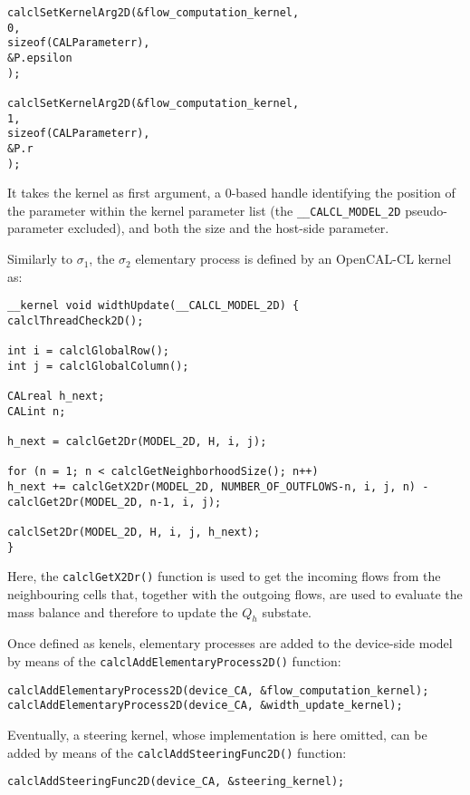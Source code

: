 \begin{lstlisting}[basicstyle=\footnotesize, numbers=none]
calclSetKernelArg2D(&flow_computation_kernel,
0,
sizeof(CALParameterr),
&P.epsilon
);

calclSetKernelArg2D(&flow_computation_kernel,
1,
sizeof(CALParameterr),
&P.r
);
\end{lstlisting}

\noindent It takes the kernel as first argument, a 0-based handle
identifying the position of the parameter within the kernel
parameter list (the \verb'__CALCL_MODEL_2D' pseudo-parameter
excluded), and both the size and the host-side parameter.

Similarly to $\sigma_1$, the $\sigma_2$ elementary process is
defined by an OpenCAL-CL kernel as:

\begin{lstlisting}[basicstyle=\footnotesize, numbers=none]
__kernel void widthUpdate(__CALCL_MODEL_2D) {
calclThreadCheck2D();

int i = calclGlobalRow();
int j = calclGlobalColumn();

CALreal h_next;
CALint n;

h_next = calclGet2Dr(MODEL_2D, H, i, j);

for (n = 1; n < calclGetNeighborhoodSize(); n++)
h_next += calclGetX2Dr(MODEL_2D, NUMBER_OF_OUTFLOWS-n, i, j, n) - calclGet2Dr(MODEL_2D, n-1, i, j);

calclSet2Dr(MODEL_2D, H, i, j, h_next);
}
\end{lstlisting}

\noindent Here, the \verb'calclGetX2Dr()' function is used to get
the incoming flows from the neighbouring cells that, together with
the outgoing flows, are used to evaluate the mass balance and
therefore to update the $Q_h$ substate.

Once defined as kenels, elementary processes are added to the
device-side model by means of the
\verb'calclAddElementaryProcess2D()' function:

\begin{lstlisting}[basicstyle=\footnotesize, numbers=none]
calclAddElementaryProcess2D(device_CA, &flow_computation_kernel);
calclAddElementaryProcess2D(device_CA, &width_update_kernel);
\end{lstlisting}

\noindent Eventually, a steering kernel, whose implementation is
here omitted, can be added by means of the
\verb'calclAddSteeringFunc2D()' function:

\begin{lstlisting}[basicstyle=\footnotesize, numbers=none]
calclAddSteeringFunc2D(device_CA, &steering_kernel);
\end{lstlisting}


